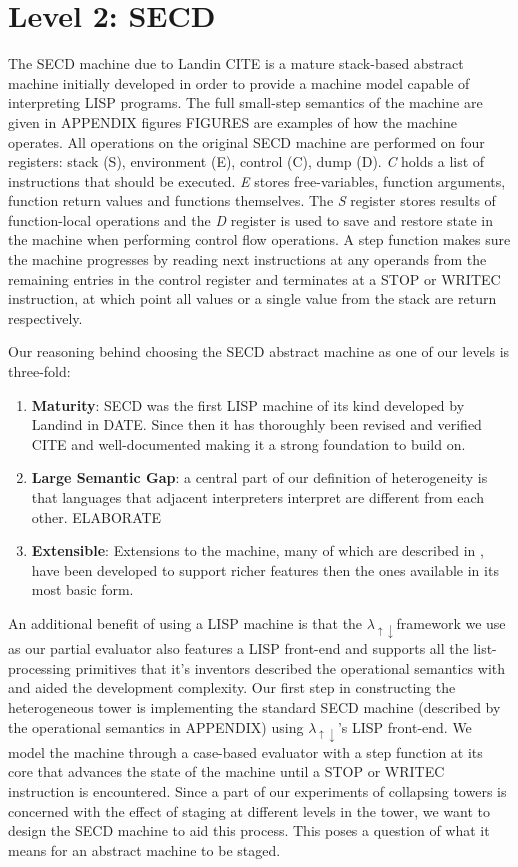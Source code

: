 \documentclass[fleqn]{article}
\theoremstyle{definition}
\newcommand{\mslang}{$\lambda_{\uparrow\downarrow}$}
\begin{document}
\section{Level 2: SECD}
The SECD machine due to Landin CITE is a mature stack-based abstract machine initially developed in order to provide a machine model capable of interpreting LISP programs. The full small-step semantics of the machine are given in APPENDIX figures FIGURES are examples of how the machine operates. All operations on the original SECD machine are performed on four registers: stack (S), environment (E), control (C), dump (D). \textit{C} holds a list of instructions that should be executed. \textit{E} stores free-variables, function arguments, function return values and functions themselves. The \textit{S} register stores results of function-local operations and the \textit{D} register is used to save and restore state in the machine when performing control flow operations. A step function makes sure the machine progresses by reading next instructions at any operands from the remaining entries in the control register and terminates at a STOP or WRITEC instruction, at which point all values or a single value from the stack are return respectively.

Our reasoning behind choosing the SECD abstract machine as one of our levels is three-fold:
\begin{enumerate}
	\item \textbf{Maturity}: SECD was the first LISP machine of its kind developed by Landind in DATE. Since then it has thoroughly been revised and verified CITE and well-documented making it a strong foundation to build on.
	\item \textbf{Large Semantic Gap}: a central part of our definition of heterogeneity is that languages that adjacent interpreters interpret are different from each other. ELABORATE
	\item \textbf{Extensible}: Extensions to the machine, many of which are described in \cite{kogge1990architecture}, have been developed to support richer features then the ones available in its most basic form.
\end{enumerate}
An additional benefit of using a LISP machine is that the \mslang framework we use as our partial evaluator also features a LISP front-end and supports all the list-processing primitives that it's inventors described the operational semantics with and aided the development complexity. Our first step in constructing the heterogeneous tower is implementing the standard SECD machine (described by the operational semantics in APPENDIX) using \mslang's LISP front-end. We model the machine through a case-based evaluator with a step function at its core that advances the state of the machine until a STOP or WRITEC instruction is encountered. Since a part of our experiments of collapsing towers is concerned with the effect of staging at different levels in the tower, we want to design the SECD machine to aid this process. This poses a question of what it means for an abstract machine to be staged.
\end{document}
